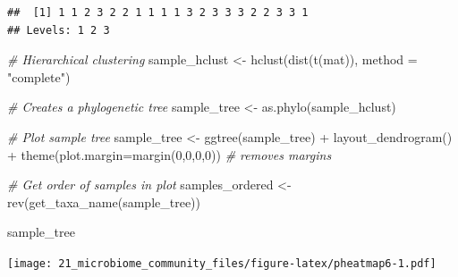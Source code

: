 \documentclass[
]{book}
\newenvironment{Shaded}{\begin{snugshade}}{\end{snugshade}}
\newcommand{\AttributeTok}[1]{\textcolor[rgb]{0.77,0.63,0.00}{#1}}
\newcommand{\CommentTok}[1]{\textcolor[rgb]{0.56,0.35,0.01}{\textit{#1}}}
\newcommand{\DecValTok}[1]{\textcolor[rgb]{0.00,0.00,0.81}{#1}}
\newcommand{\FunctionTok}[1]{\textcolor[rgb]{0.00,0.00,0.00}{#1}}
\newcommand{\NormalTok}[1]{#1}
\newcommand{\OtherTok}[1]{\textcolor[rgb]{0.56,0.35,0.01}{#1}}
\newcommand{\SpecialCharTok}[1]{\textcolor[rgb]{0.00,0.00,0.00}{#1}}
\newcommand{\StringTok}[1]{\textcolor[rgb]{0.31,0.60,0.02}{#1}}
\begin{document}
\begin{verbatim}
##  [1] 1 1 2 3 2 2 1 1 1 1 3 2 3 3 3 2 2 3 3 1
## Levels: 1 2 3
\end{verbatim}

\begin{Shaded}
\begin{Highlighting}[]
\CommentTok{\# Hierarchical clustering}
\NormalTok{sample\_hclust }\OtherTok{\textless{}{-}} \FunctionTok{hclust}\NormalTok{(}\FunctionTok{dist}\NormalTok{(}\FunctionTok{t}\NormalTok{(mat)), }\AttributeTok{method =} \StringTok{"complete"}\NormalTok{)}

\CommentTok{\# Creates a phylogenetic tree}
\NormalTok{sample\_tree }\OtherTok{\textless{}{-}} \FunctionTok{as.phylo}\NormalTok{(sample\_hclust)}

\CommentTok{\# Plot sample tree}
\NormalTok{sample\_tree }\OtherTok{\textless{}{-}} \FunctionTok{ggtree}\NormalTok{(sample\_tree) }\SpecialCharTok{+} \FunctionTok{layout\_dendrogram}\NormalTok{() }\SpecialCharTok{+} 
  \FunctionTok{theme}\NormalTok{(}\AttributeTok{plot.margin=}\FunctionTok{margin}\NormalTok{(}\DecValTok{0}\NormalTok{,}\DecValTok{0}\NormalTok{,}\DecValTok{0}\NormalTok{,}\DecValTok{0}\NormalTok{)) }\CommentTok{\# removes margins}

\CommentTok{\# Get order of samples in plot}
\NormalTok{samples\_ordered }\OtherTok{\textless{}{-}} \FunctionTok{rev}\NormalTok{(}\FunctionTok{get\_taxa\_name}\NormalTok{(sample\_tree))}

\NormalTok{sample\_tree}
\end{Highlighting}
\end{Shaded}

\texttt{[image: 21\_microbiome\_community\_files/figure-latex/pheatmap6-1.pdf]}
\end{document}
